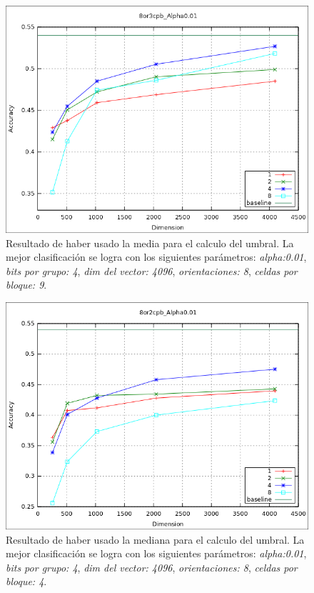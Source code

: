 			\begin{figure}[htbp!]
				\centering
				\includegraphics[scale=0.6]{img/resultados/reales/media_8or3cpb_Alpha0,01.png}
				\caption[Reales con umbral media]{Resultado de haber usado la media para el calculo del umbral. La mejor clasificación se logra con los siguientes parámetros: \textit{alpha:0.01}, \textit{bits por grupo: 4}, \textit{dim del vector: 4096}, \textit{orientaciones: 8}, \textit{celdas por bloque: 9}.}
				\label{fig: Reales-media-8or9cpbAlph0.01}
			\end{figure}
			
			\begin{figure}[htbp]
				\centering
				\includegraphics[scale=0.6]{img/resultados/reales/median_8or2cpb_Alpha0,01.png}
				\caption[Reales con umbral mediana]{Resultado de haber usado la mediana para el calculo del umbral. La mejor clasificación se logra con los siguientes parámetros: \textit{alpha:0.01}, \textit{bits por grupo: 4}, \textit{dim del vector: 4096}, \textit{orientaciones: 8}, \textit{celdas por bloque: 4}.}
				\label{fig: Reales-mediana-8or4cpbAlph0.01}
			\end{figure}
			
